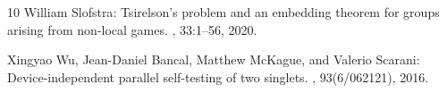 \documentclass[11pt]{article}
\numberwithin{equation}{section}
\theoremstyle{definition}
\theoremstyle{plain}
\begin{document}
\begin{thebibliography}{10}
{\sc William Slofstra}: Tsirelson's problem and an embedding theorem for groups
  arising from non-local games.
, 33:1--56, 2020.

{\sc Xingyao Wu, Jean-Daniel Bancal, Matthew McKague, and Valerio Scarani}:
  Device-independent parallel self-testing of two singlets.
, 93(6/062121), 2016.

\end{thebibliography}
\end{document}
